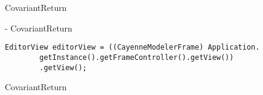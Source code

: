 \begin{pattern}{CovariantReturn}

\instances{}

- CovariantReturn
\begin{verbatim}
EditorView editorView = ((CayenneModelerFrame) Application.
        getInstance().getFrameController().getView())
        .getView();
\end{verbatim}

\detection{}
    
\discussion{}
    
\related{} 

\end{pattern}{CovariantReturn}